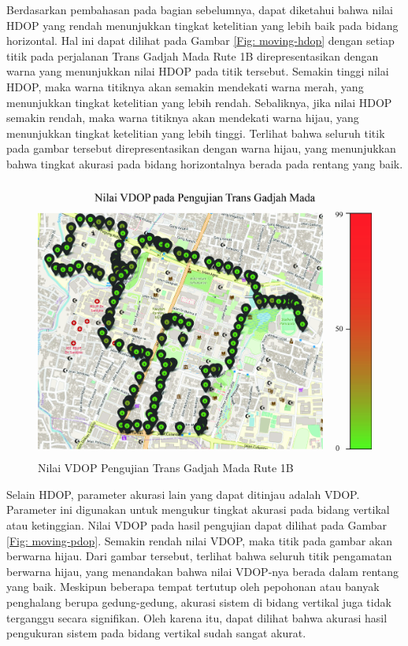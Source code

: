 Berdasarkan pembahasan pada bagian sebelumnya, dapat diketahui bahwa nilai HDOP yang rendah menunjukkan tingkat ketelitian yang lebih baik pada bidang horizontal. Hal ini dapat dilihat pada Gambar \ref{Fig: moving-hdop} dengan setiap titik pada perjalanan Trans Gadjah Mada Rute 1B direpresentasikan dengan warna yang menunjukkan nilai HDOP pada titik tersebut. Semakin tinggi nilai HDOP, maka warna titiknya akan semakin mendekati warna merah, yang menunjukkan tingkat ketelitian yang lebih rendah. Sebaliknya, jika nilai HDOP semakin rendah, maka warna titiknya akan mendekati warna hijau, yang menunjukkan tingkat ketelitian yang lebih tinggi. Terlihat bahwa seluruh titik pada gambar tersebut direpresentasikan dengan warna hijau, yang menunjukkan bahwa tingkat akurasi pada bidang horizontalnya berada pada rentang yang baik.

\begin{figure}[H]
	\centering
	\includegraphics[width=12cm]{contents/chapter-4/pengujian-bergerak/moving-VDOP.jpg}
	\caption{Nilai VDOP Pengujian Trans Gadjah Mada Rute 1B}
	\label{Fig: moving-vdop}
\end{figure}

Selain HDOP, parameter akurasi lain yang dapat ditinjau adalah VDOP. Parameter ini digunakan untuk mengukur tingkat akurasi pada bidang vertikal atau ketinggian. Nilai VDOP pada hasil pengujian dapat dilihat pada Gambar \ref{Fig: moving-pdop}. Semakin rendah nilai VDOP, maka titik pada gambar akan berwarna hijau. Dari gambar tersebut, terlihat bahwa seluruh titik pengamatan berwarna hijau, yang menandakan bahwa nilai VDOP-nya berada dalam rentang yang baik. Meskipun beberapa tempat tertutup oleh pepohonan atau banyak penghalang berupa gedung-gedung, akurasi sistem di bidang vertikal juga tidak terganggu secara signifikan. Oleh karena itu, dapat dilihat bahwa akurasi hasil pengukuran sistem pada bidang vertikal sudah sangat akurat.

